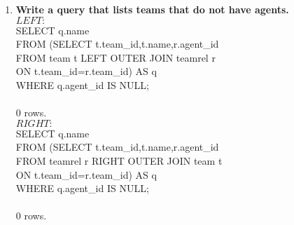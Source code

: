 \documentclass{article}
\begin{document}
\begin{enumerate}
\item
\textbf{Write a query that lists teams that do not have agents.\\}
$LEFT:$\\
SELECT q.name\\
FROM (SELECT t.team\_id,t.name,r.agent\_id\\
\hspace*{1 cm}FROM team t LEFT OUTER JOIN teamrel r\\
\hspace*{1 cm}ON t.team\_id=r.team\_id) AS q\\
\hspace*{5 cm}                        WHERE q.agent\_id IS NULL;\\
\\0 rows.\\

$RIGHT:$\\
SELECT q.name\\
FROM (SELECT t.team\_id,t.name,r.agent\_id\\
\hspace*{1 cm}FROM teamrel r RIGHT OUTER JOIN team t\\
\hspace*{1 cm}ON t.team\_id=r.team\_id) AS q\\
\hspace*{5 cm}                        WHERE q.agent\_id IS NULL;\\
\\0 rows.\\

\end{enumerate}
\end{document}
